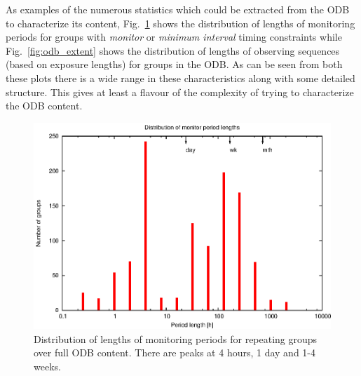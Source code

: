 {{As examples of the numerous statistics which could be extracted from the ODB to characterize its content,  Fig.~\ref{fig:odb_period} shows the distribution of lengths of monitoring periods for groups with \emph{monitor} or \emph{minimum interval} timing constraints while Fig.~\ref{fig:odb_extent} shows the distribution of lengths of observing sequences (based on exposure lengths) for groups in the ODB. As can be seen from both these plots there is a wide range in these characteristics along with some detailed structure. This gives at least a flavour of the complexity of trying to characterize the ODB content.

\begin{figure}[htbp]
\begin{center}
    \includegraphics[scale=1.0, angle=0]{figures/per.eps}
\end{center} 
\caption[Distribution of lengths of monitoring periods for repeating groups over full ODB content.]
{Distribution of lengths of monitoring periods for repeating groups over full ODB content. There are peaks at 4 hours, 1 day and 1-4 weeks.}
\label{fig:odb_period}
\end{figure}

}}
